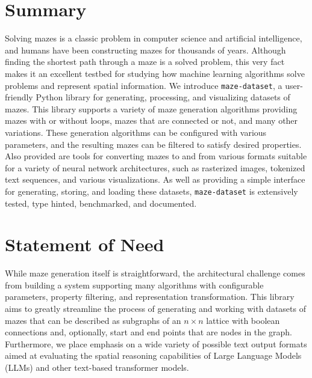 \documentclass[10pt,a4paper,onecolumn]{article}
\begin{document}
\hypertarget{summary}{%
\section{Summary}\label{summary}}

Solving mazes is a classic problem in computer science and artificial
intelligence, and humans have been constructing mazes for thousands of
years. Although finding the shortest path through a maze is a solved
problem, this very fact makes it an excellent testbed for studying how
machine learning algorithms solve problems and represent spatial
information. We introduce \texttt{maze-dataset}, a user-friendly Python
library for generating, processing, and visualizing datasets of mazes.
This library supports a variety of maze generation algorithms providing
mazes with or without loops, mazes that are connected or not, and many
other variations. These generation algorithms can be configured with
various parameters, and the resulting mazes can be filtered to satisfy
desired properties. Also provided are tools for converting mazes to and
from various formats suitable for a variety of neural network
architectures, such as rasterized images, tokenized text sequences, and
various visualizations. As well as providing a simple interface for
generating, storing, and loading these datasets, \texttt{maze-dataset}
is extensively tested, type hinted, benchmarked, and documented.



\hypertarget{statement-of-need}{%
\section{Statement of Need}\label{statement-of-need}}

While maze generation itself is straightforward, the architectural
challenge comes from building a system supporting many algorithms with
configurable parameters, property filtering, and representation
transformation. This library aims to greatly streamline the process of
generating and working with datasets of mazes that can be described as
subgraphs of an \(n \times n\) lattice with boolean connections and,
optionally, start and end points that are nodes in the graph.
Furthermore, we place emphasis on a wide variety of possible text output
formats aimed at evaluating the spatial reasoning capabilities of Large
Language Models (LLMs) and other text-based transformer models.
\end{document}
